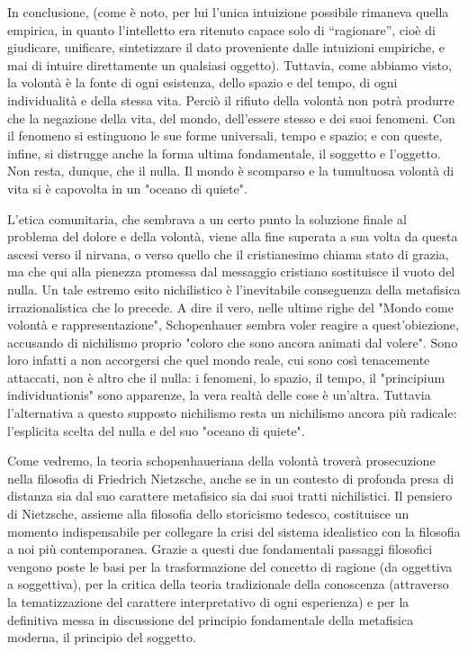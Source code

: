 In conclusione, (come è noto, per lui l’unica intuizione possibile rimaneva quella empirica, in quanto l’intelletto era ritenuto capace solo di “ragionare”, cioè di giudicare, unificare, sintetizzare il dato proveniente dalle intuizioni empiriche, e mai di intuire direttamente un qualsiasi oggetto). Tuttavia, come abbiamo visto, la volontà è la fonte di ogni esistenza, dello spazio e del tempo, di ogni individualità e della stessa vita. Perciò il rifiuto della volontà non potrà produrre che la negazione della vita, del mondo, dell’essere stesso e dei suoi fenomeni. Con il fenomeno si estinguono le sue forme universali, tempo e spazio; e con queste, infine, si distrugge anche la forma ultima fondamentale, il soggetto e l’oggetto. Non resta, dunque, che il nulla. Il mondo è scomparso e la tumultuosa volontà di vita si è capovolta in un "oceano di quiete".

 L’etica comunitaria, che sembrava a un certo punto la soluzione finale al problema del dolore e della volontà, viene alla fine superata a sua volta da questa ascesi verso il nirvana, o verso quello che il cristianesimo chiama stato di grazia, ma che qui alla pienezza promessa dal messaggio cristiano sostituisce il vuoto del nulla. Un tale estremo esito nichilistico è l’inevitabile conseguenza della metafisica irrazionalistica che lo precede. A dire il vero, nelle ultime righe del "Mondo come volontà e rappresentazione", Schopenhauer sembra voler reagire a quest’obiezione, accusando di nichilismo proprio "coloro che sono ancora animati dal volere". Sono loro infatti a non accorgersi che quel mondo reale, cui sono così tenacemente attaccati, non è altro che il nulla: i fenomeni, lo spazio, il tempo, il "principium individuationis" sono apparenze, la vera realtà delle cose è un’altra. Tuttavia l’alternativa a questo supposto nichilismo resta un nichilismo ancora più radicale: l’esplicita scelta del nulla e del suo "oceano di quiete". 
 
 Come vedremo, la teoria schopenhaueriana della volontà troverà prosecuzione nella filosofia di Friedrich Nietzsche, anche se in un contesto di profonda presa di distanza sia dal suo carattere metafisico sia dai suoi tratti nichilistici. Il pensiero di Nietzsche, assieme alla filosofia dello storicismo tedesco, costituisce un momento indispensabile per collegare la crisi del sistema idealistico con la filosofia a noi più contemporanea. Grazie a questi due fondamentali passaggi filosofici vengono poste le basi per la trasformazione del concetto di ragione (da oggettiva a soggettiva), per la critica della teoria tradizionale della conoscenza (attraverso la tematizzazione del carattere interpretativo di ogni esperienza) e per la definitiva messa in discussione del principio fondamentale della metafisica moderna, il principio del soggetto.